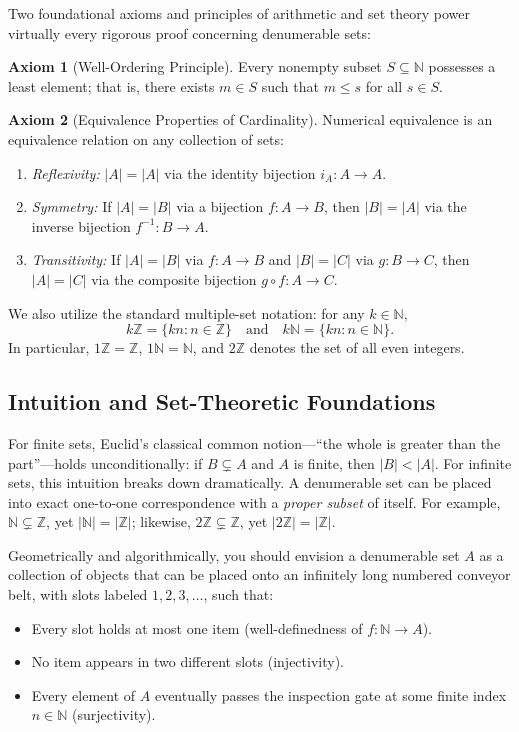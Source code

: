\documentclass[11pt, letterpaper]{article}
\theoremstyle{definition}
\newtheorem{axiom}{Axiom}[section]
\theoremstyle{remark}
\begin{document}
Two foundational axioms and principles of arithmetic and set theory power virtually every rigorous proof concerning denumerable sets:

\begin{axiom}[Well-Ordering Principle]
Every nonempty subset $S \subseteq \mathbb{N}$ possesses a least element; that is, there exists $m \in S$ such that $m \le s$ for all $s \in S$.
\end{axiom}

\begin{axiom}[Equivalence Properties of Cardinality]
Numerical equivalence is an equivalence relation on any collection of sets:
\begin{enumerate}[label=(\roman*)]
    \item \emph{Reflexivity:} $|A| = |A|$ via the identity bijection $i_A : A \to A$.
    \item \emph{Symmetry:} If $|A| = |B|$ via a bijection $f : A \to B$, then $|B| = |A|$ via the inverse bijection $f^{-1} : B \to A$.
    \item \emph{Transitivity:} If $|A| = |B|$ via $f : A \to B$ and $|B| = |C|$ via $g : B \to C$, then $|A| = |C|$ via the composite bijection $g \circ f : A \to C$.
\end{enumerate}
\end{axiom}

We also utilize the standard multiple-set notation: for any $k \in \mathbb{N}$,
\[
k\mathbb{Z} = \{kn : n \in \mathbb{Z}\} \quad \text{and} \quad k\mathbb{N} = \{kn : n \in \mathbb{N}\}.
\]
In particular, $1\mathbb{Z} = \mathbb{Z}$, $1\mathbb{N} = \mathbb{N}$, and $2\mathbb{Z}$ denotes the set of all even integers.

\subsection{Intuition and Set-Theoretic Foundations}

For finite sets, Euclid's classical common notion---``the whole is greater than the part''---holds unconditionally: if $B \subsetneq A$ and $A$ is finite, then $|B| < |A|$. For infinite sets, this intuition breaks down dramatically. A denumerable set can be placed into exact one-to-one correspondence with a \emph{proper subset} of itself. For example, $\mathbb{N} \subsetneq \mathbb{Z}$, yet $|\mathbb{N}| = |\mathbb{Z}|$; likewise, $2\mathbb{Z} \subsetneq \mathbb{Z}$, yet $|2\mathbb{Z}| = |\mathbb{Z}|$.

Geometrically and algorithmically, you should envision a denumerable set $A$ as a collection of objects that can be placed onto an infinitely long numbered conveyor belt, with slots labeled $1, 2, 3, \dots$, such that:
\begin{itemize}
    \item Every slot holds at most one item (well-definedness of $f : \mathbb{N} \to A$).
    \item No item appears in two different slots (injectivity).
    \item Every element of $A$ eventually passes the inspection gate at some finite index $n \in \mathbb{N}$ (surjectivity).
\end{itemize}
\end{document}

